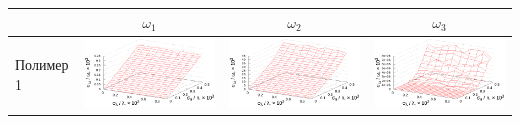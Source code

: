\documentclass[12pt,a4paper]{article}
\begin{document}
\begin{table}[h]
  \centering
  \footnotesize
  \begin{tabular}{l | c c c}
	  & $\omega_1$ & $\omega_2$ & $\omega_3$ \\ \hline
	\begin{rotate}{90}Полимер 1\end{rotate} &	\includegraphics[scale=0.4]{figs/even/p1.txt_coeff0.dat.eps} & \includegraphics[scale=0.4]{figs/even/p1.txt_coeff1.dat.eps} & \includegraphics[scale=0.4]{figs/even/p1.txt_coeff2.dat.eps} \\

\end{tabular}
\end{table}
\end{document}
